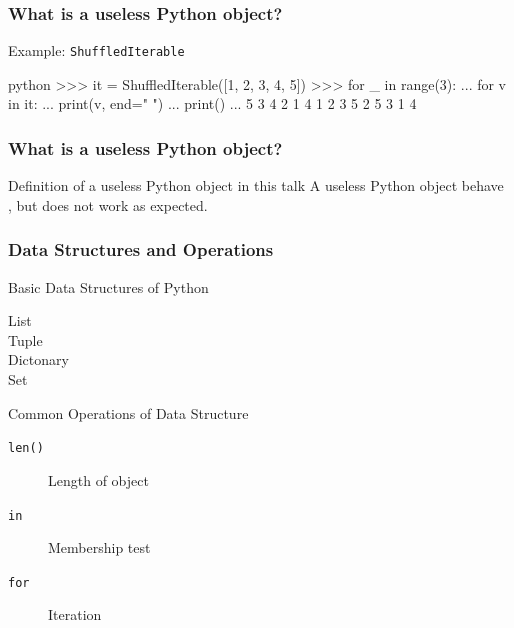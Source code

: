 \documentclass[aspectratio=169,dvipdfmx,12pt,notheorems]{beamer}
\theoremstyle{definition}
\begin{document}
\begin{frame}[fragile]\frametitle{What is a useless Python object?}

\begin{exampleblock}{Example: \texttt{ShuffledIterable}}
\begin{pygments}{python}
>>> it = ShuffledIterable([1, 2, 3, 4, 5])
>>> for _ in range(3):
...     for v in it:
...         print(v, end=" ")
...     print()
...
5 3 4 2 1 
4 1 2 3 5 
2 5 3 1 4
\end{pygments}
\end{exampleblock}

\end{frame}

\begin{frame}\frametitle{What is a useless Python object?}

\begin{block}{Definition of a useless Python object in this talk}
A useless Python object behave , but does not work as expected.
\end{block}

\end{frame}

\begin{frame}[fragile]\frametitle{Data Structures and Operations}

\begin{block}{Basic Data Structures of Python}
\begin{description}
\item[List] \pyv{[1, 4, 9, 16, 25, 36]}
\item[Tuple] 
\item[Dictonary] 
\item[Set] 
\end{description}
\end{block}

\begin{block}{Common Operations of Data Structure}
\begin{description}
\item[\texttt{len()}] Length of object
\item[\texttt{in}] Membership test
\item[\texttt{for}] Iteration
\end{description}
\end{block}

\end{frame}
\end{document}
